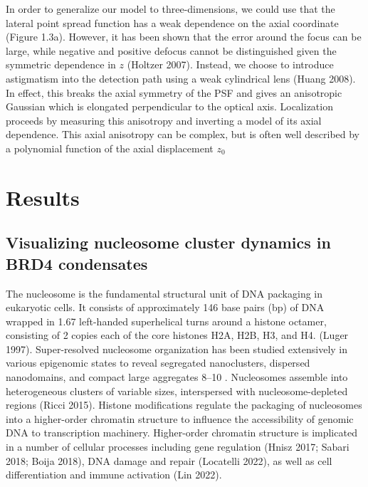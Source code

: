 \documentclass{ucetd}
\begin{document}
In order to generalize our model to three-dimensions, we could use that the lateral point spread function has a weak dependence on the axial coordinate (Figure 1.3a). However, it has been shown that the error around the focus can be large, while negative and positive defocus cannot be distinguished given the symmetric dependence in $z$ (Holtzer 2007). Instead, we choose to introduce astigmatism into the detection path using a weak cylindrical lens (Huang 2008). In effect, this breaks the axial symmetry of the PSF and gives an anisotropic Gaussian which is elongated perpendicular to the optical axis. Localization proceeds by measuring this anisotropy and inverting a model of its axial dependence. This axial anisotropy can be complex, but is often well described by a polynomial function of the axial displacement $z_{0}$


\section{Results}

\subsection{Visualizing nucleosome cluster dynamics in BRD4 condensates}

The nucleosome is the fundamental structural unit of DNA packaging in eukaryotic cells. It consists of approximately 146 base pairs (bp) of DNA wrapped in 1.67 left-handed superhelical turns around a histone octamer, consisting of 2 copies each of the core histones H2A, H2B, H3, and H4. (Luger 1997). Super-resolved nucleosome organization has been studied extensively in various epigenomic states to reveal segregated nanoclusters, dispersed nanodomains, and compact large aggregates  8–10 . Nucleosomes assemble into heterogeneous clusters of variable sizes, interspersed with nucleosome-depleted regions (Ricci 2015). Histone modiﬁcations regulate the packaging of nucleosomes into a higher-order chromatin structure to inﬂuence the accessibility of genomic DNA to transcription machinery. Higher-order chromatin structure is implicated in a number of cellular processes including gene regulation (Hnisz 2017; Sabari 2018; Boija 2018), DNA damage and repair (Locatelli 2022), as well as cell differentiation and immune activation (Lin 2022).
\end{document}
